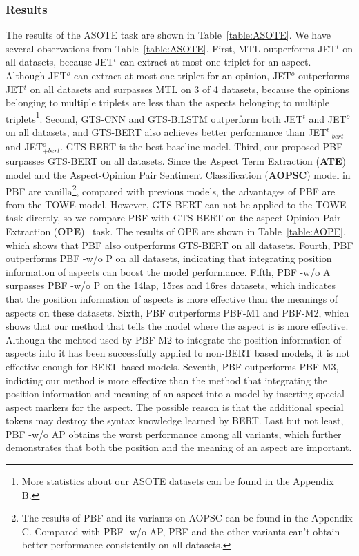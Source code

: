 \documentclass[11pt]{article}
\begin{document}
\subsubsection{Results}
\label{asote_result}
The results of the ASOTE task are
shown in Table~\ref{table:ASOTE}. We have several observations from Table~\ref{table:ASOTE}. First, MTL outperforms JET$^t$ on all datasets, because JET$^t$ can extract at most one triplet for an aspect. Although JET$^o$  can extract at most one triplet for an opinion, JET$^o$ outperforms JET$^t$ on all datasets and surpasses MTL on 3 of 4 datasets, because the opinions belonging to multiple triplets are less than the aspects belonging to multiple triplets\footnote{More statistics about our ASOTE datasets can be found in the Appendix B.}. Second, GTS-CNN and GTS-BiLSTM outperform  both JET$^t$ and JET$^o$ on all datasets, and GTS-BERT also achieves better performance than JET$^t_{+bert}$ and JET$^o_{+bert}$. GTS-BERT is the best baseline model. Third, our proposed PBF surpasses GTS-BERT on all datasets. Since the Aspect Term Extraction (\textbf{ATE}) model and the Aspect-Opinion Pair Sentiment Classification (\textbf{AOPSC}) model in PBF are vanilla\footnote{The results of PBF and its variants on AOPSC can be found in the Appendix C. Compared with PBF -w/o AP, PBF and the other variants can't obtain better performance consistently on all datasets.},  compared with previous models, the advantages of PBF are from the TOWE model. However,  GTS-BERT can not be applied to the TOWE task directly, so we compare PBF with GTS-BERT on the aspect-Opinion Pair Extraction (\textbf{OPE})~\citep{wu-etal-2020-grid} task. The results of OPE are shown in Table~\ref{table:AOPE}, which shows that PBF also outperforms GTS-BERT on all datasets. Fourth, PBF outperforms PBF -w/o P on all datasets, indicating that integrating position information of aspects can boost the model performance. Fifth, PBF -w/o A surpasses PBF -w/o P on the 14lap, 15res and 16res datasets, which indicates that the position information of aspects is more effective than the meanings of aspects on these datasets. Sixth, PBF outperforms PBF-M1 and PBF-M2, which shows that our method that tells the model where the aspect is is more effective. Although the mehtod used by PBF-M2 to integrate the position information of aspects into it has been successfully applied to non-BERT based models, it is not effective enough for BERT-based models. Seventh, PBF outperforms PBF-M3, indicting our method is more effective than the method that integrating the position information and meaning of an aspect into a model by inserting special aspect markers for the aspect. The possible reason is that the additional
special tokens may destroy the syntax knowledge
learned by BERT. Last but not least, PBF -w/o AP obtains the worst performance among all variants, which further demonstrates that both the position and the meaning of an aspect are important.
\end{document}
